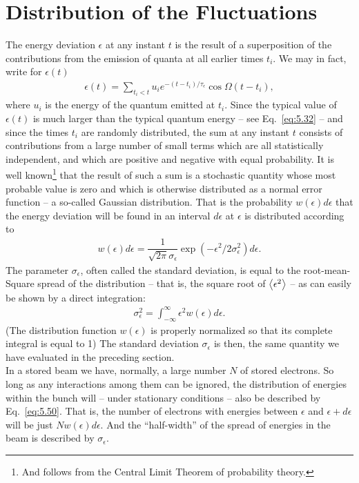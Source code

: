 \section{Distribution of the Fluctuations}\label{sec:5.3}

The energy deviation $\epsilon$ at any instant $t$ is the result of a superposition of the
contributions from the emission of quanta at all earlier times $t_i$. We may in fact, write for $\epsilon(t)$
\begin{align} \label{eq:5.49}
	\epsilon(t) = \sum_{t_i<t} u_i e^{-(t-t_i)/\tau_\epsilon}\cos\Omega(t-t_i),
\end{align}
where $u_i$ is the energy of the quantum emitted at $t_i$. Since the typical value of $\epsilon(t)$ is much larger than the typical quantum energy -- see Eq.~\eqref{eq:5.32} -- and since the times $t_i$ are randomly distributed, the sum at any instant $t$ consists of contributions from a large number of small terms which are all statistically independent, and which are positive and negative with equal probability. It is well known\footnote{And follows from the Central Limit Theorem of probability theory.} that the result of such a sum is a stochastic quantity whose most probable value is zero and which is otherwise distributed as a normal error function -- a so-called Gaussian distribution. That is the probability $w(\epsilon)d\epsilon$ that the energy deviation
will be found in an interval $d\epsilon$ at $\epsilon$ is distributed according to
\begin{align}\label{eq:5.50}
	w(\epsilon)d\epsilon = \dfrac{1}{\sqrt{2\pi}\sigma_\epsilon} \exp{(-\epsilon^2/2\sigma_\epsilon^2)}d\epsilon.
\end{align}
The parameter $\sigma_\epsilon$, often called the standard deviation, is equal to the root-mean-
Square spread of the distribution -- that is, the square root of $\left< \epsilon^2 \right>$ -- as can
easily be shown by a direct integration:
\begin{align}
	\sigma_\epsilon^2 = \int_{-\infty}^{\infty} \epsilon^2 w(\epsilon) d\epsilon.
\end{align}
(The distribution function $w(\epsilon)$ is properly normalized so that its complete integral
is equal to 1) The standard deviation $\sigma_\epsilon$ is then, the same quantity we have evaluated in the preceding section.\\
In a stored beam we have, normally, a large number $N$ of stored electrons. So long as any interactions among them can be ignored, the distribution of energies within the bunch will -- under stationary conditions -- also be described by Eq.~\eqref{eq:5.50}. That is, the number of electrons with energies between $\epsilon$ and $\epsilon+d\epsilon$ will be just $Nw(\epsilon)d\epsilon$. And the ``half-width'' of the spread of energies in the beam is described by $\sigma_\epsilon$.\\
